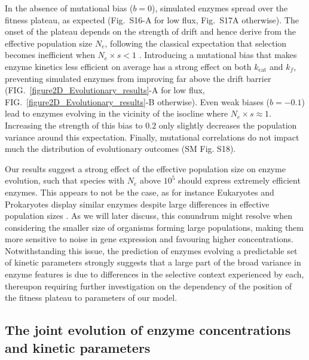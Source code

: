 \documentclass[nogrid,crop,final]{MBE2}%
\begin{document}
In the absence of mutational bias ($b=0$), simulated enzymes spread over the fitness plateau, as expected (Fig.~S16-A for low flux, Fig.~S17A otherwise). The onset of the plateau depends on the strength of drift and hence derive from the effective population size $N_e$, following the classical expectation that selection becomes inefficient when $N_e \times s < 1$ \citep{Wright31,Kimura68}. Introducing a mutational bias that makes enzyme kinetics less efficient on average has a strong effect on both $k_\text{cat}$ and $k_f$, preventing simulated enzymes from improving far above the drift barrier (FIG.~\ref{figure2D_Evolutionary_results}-A for low flux, FIG.~\ref{figure2D_Evolutionary_results}-B otherwise). 
Even weak biases ($b=-0.1$) lead to enzymes evolving in the vicinity of the isocline where $N_e \times s \approx 1$. Increasing the strength of this bias to $0.2$ only slightly decreases the population variance around this expectation. Finally, mutational correlations do not impact much the distribution of evolutionary outcomes (SM Fig. S18).

Our results suggest a strong effect of the effective population size on enzyme evolution, such that species with $N_e$ above $10^5$ \citep[most unicellular organisms]{Bobay18} should express extremely efficient enzymes. This appears to not be the case, as for instance Eukaryotes and Prokaryotes display similar enzymes despite large differences in effective population sizes \citep{Bar-Even11}. As we will later discuss, this conundrum might resolve when considering the smaller size of organisms forming large populations, making them more sensitive to noise in gene expression and favouring higher concentrations. 
Notwithstanding this issue, the prediction of enzymes evolving a predictable set of kinetic parameters strongly suggests that a large part of the broad variance in enzyme features is due to differences in the selective context experienced by each, thereupon requiring further investigation on the dependency of the position of the fitness plateau to parameters of our model.

\subsection{The joint evolution of enzyme concentrations and kinetic parameters}
\end{document}
